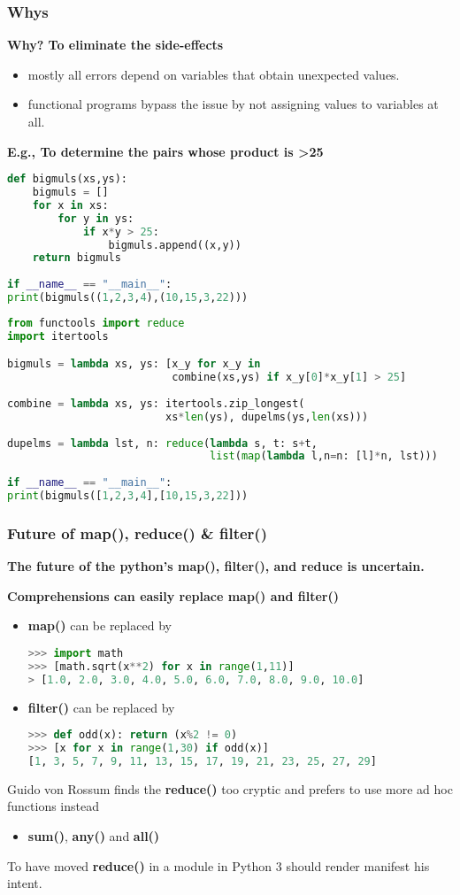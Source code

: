\subsubsection{Whys}

\textbf{Why? To eliminate the side-effects}
\begin{itemize}
	\item mostly all errors depend on variables that obtain unexpected values.
	\item functional programs bypass the issue by not assigning values to variables at all.
\end{itemize}

\textbf{E.g., To determine the pairs whose product is >25}
\begin{lstlisting}[language=Python]
def bigmuls(xs,ys):
	bigmuls = []
	for x in xs:
		for y in ys:
			if x*y > 25:
				bigmuls.append((x,y))
	return bigmuls
	
if __name__ == "__main__":
print(bigmuls((1,2,3,4),(10,15,3,22)))
\end{lstlisting}

 
\begin{lstlisting}[language=Python]
from functools import reduce
import itertools

bigmuls = lambda xs, ys: [x_y for x_y in
						  combine(xs,ys) if x_y[0]*x_y[1] > 25]
						  
combine = lambda xs, ys: itertools.zip_longest(
			             xs*len(ys), dupelms(ys,len(xs)))
			             
dupelms = lambda lst, n: reduce(lambda s, t: s+t,
                                list(map(lambda l,n=n: [l]*n, lst)))
                                
if __name__ == "__main__":
print(bigmuls([1,2,3,4],[10,15,3,22]))
\end{lstlisting}

\subsubsection{Future of map(), reduce() \& filter()}
\textbf{The future of the python's map(), filter(), and reduce is uncertain.}

\textbf{Comprehensions can easily replace map() and filter()}

\begin{itemize}
	\item \textbf{map()} can be replaced by
\begin{lstlisting}[language=Python]
>>> import math
>>> [math.sqrt(x**2) for x in range(1,11)]
> [1.0, 2.0, 3.0, 4.0, 5.0, 6.0, 7.0, 8.0, 9.0, 10.0]
\end{lstlisting}
	\item \textbf{filter()} can be replaced by
\begin{lstlisting}[language=Python]
>>> def odd(x): return (x%2 != 0)
>>> [x for x in range(1,30) if odd(x)]
[1, 3, 5, 7, 9, 11, 13, 15, 17, 19, 21, 23, 25, 27, 29]
\end{lstlisting}
\end{itemize}

Guido von Rossum finds the \textbf{reduce()} too cryptic and prefers to use more ad hoc functions instead
\begin{itemize}
	\item \textbf{sum()}, \textbf{any()} and \textbf{all()}
\end{itemize}
To have moved \textbf{reduce()} in a module in Python 3 should render manifest his intent.